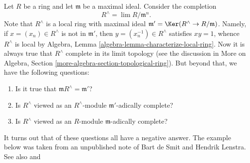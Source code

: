 \noindent
Let $R$ be a ring and let $\mathfrak m$ be a maximal ideal. Consider the
completion
$$
R^\wedge = \lim R/\mathfrak m^n.
$$
Note that $R^\wedge$ is a local ring with maximal ideal
$\mathfrak m' = \Ker(R^\wedge \to R/\mathfrak m)$.
Namely, if $x = (x_n) \in R^\wedge$ is not in $\mathfrak m'$, then
$y = (x_n^{-1}) \in R^\wedge$ satisfies $xy = 1$, whence $R^\wedge$ is local by
Algebra, Lemma \ref{algebra-lemma-characterize-local-ring}. Now it is
always true that $R^\wedge$ complete in its limit topology (see the
discussion in
More on Algebra, Section \ref{more-algebra-section-topological-ring}).
But beyond that, we have the following questions:
\begin{enumerate}
\item Is it true that $\mathfrak m R^\wedge = \mathfrak m'$?
\item Is $R^\wedge$ viewed as an $R^\wedge$-module $\mathfrak m'$-adically
complete?
\item Is $R^\wedge$ viewed as an $R$-module $\mathfrak m$-adically complete?
\end{enumerate}
It turns out that of these questions all have a negative answer.
The example below was taken from an unpublished note of
Bart de Smit and Hendrik Lenstra. See also
\cite[Exercise III.2.12]{Bourbaki-CA} and
\cite[Example 1.8]{Yekutieli}

